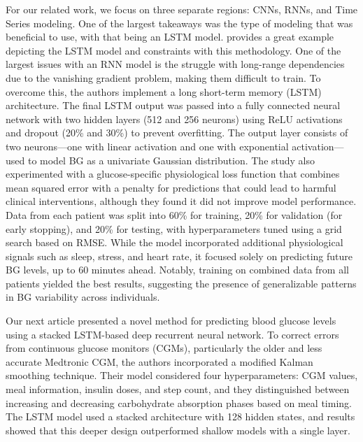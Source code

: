 \documentclass{article}
\begin{document}
For our related work, we focus on three separate regions: CNNs, RNNs, and Time Series modeling. One of the largest takeaways was the type of modeling that was beneficial to use, with that being an LSTM model. \cite{Blood_Glucose_RNN} provides a great example depicting the LSTM model and constraints with this methodology. One of the largest issues with an RNN model is the struggle with long-range dependencies due to the vanishing gradient problem, making them difficult to train. To overcome this, the authors implement a long short-term memory (LSTM) architecture. The final LSTM output was passed into a fully connected neural network with two hidden layers (512 and 256 neurons) using ReLU activations and dropout (20\% and 30\%) to prevent overfitting. The output layer consists of two neurons—one with linear activation and one with exponential activation—used to model BG as a univariate Gaussian distribution. The study also experimented with a glucose-specific physiological loss function that combines mean squared error with a penalty for predictions that could lead to harmful clinical interventions, although they found it did not improve model performance. Data from each patient was split into 60\% for training, 20\% for validation (for early stopping), and 20\% for testing, with hyperparameters tuned using a grid search based on RMSE. While the model incorporated additional physiological signals such as sleep, stress, and heart rate, it focused solely on predicting future BG levels, up to 60 minutes ahead. Notably, training on combined data from all patients yielded the best results, suggesting the presence of generalizable patterns in BG variability across individuals.

Our next article \cite{StackedLSTM} presented a novel method for predicting blood glucose levels using a stacked LSTM-based deep recurrent neural network. To correct errors from continuous glucose monitors (CGMs), particularly the older and less accurate Medtronic CGM, the authors incorporated a modified Kalman smoothing technique. Their model considered four hyperparameters: CGM values, meal information, insulin doses, and step count, and they distinguished between increasing and decreasing carbohydrate absorption phases based on meal timing. The LSTM model used a stacked architecture with 128 hidden states, and results showed that this deeper design outperformed shallow models with a single layer.

\newpage
\end{document}
